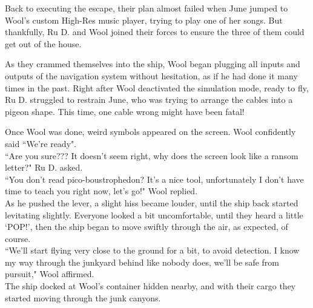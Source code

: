 Back to executing the escape, their plan almost failed when June jumped to Wool's custom High-Res music player, trying to play one of her songs. But thankfully, Ru D. and Wool joined their forces to ensure the three of them could get out of the house.


As they crammed themselves into the ship, Wool began plugging all inputs and outputs of the navigation system without hesitation, as if he had done it many times in the past.
Right after Wool deactivated the simulation mode, ready to fly, Ru D. struggled to restrain June, who was trying to arrange the cables into a pigeon shape. This time, one cable wrong might have been fatal! 

Once Wool was done, weird symbols appeared on the screen. Wool confidently said ``We're ready".\\
``Are you sure??? It doesn't seem right, why does the screen look like a ransom letter?" Ru D. asked.\\
``You don't read pico-boustrophedon? It's a nice tool, unfortunately I don't have time to teach you right now, let's go!" Wool replied.\\
As he pushed the lever, a slight hiss became louder, until the ship back started levitating slightly. Everyone looked a bit uncomfortable, until they heard a little `POP!', then the ship began to move swiftly through the air, as expected, of course.\\
``We'll start flying very close to the ground for a bit, to avoid detection. I know my way through the junkyard behind like nobody does, we'll be safe from pursuit," Wool affirmed.\\
The ship docked at Wool's container hidden nearby, and with their cargo they started moving through the junk canyons.

